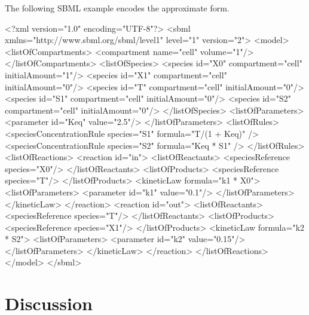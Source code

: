 \documentclass[10pt]{cekarticle}
\newcommand{\changed}[1]{\textcolor{BrickRed}{#1}}
\newenvironment{blockChanged}{\color{BrickRed}}{}
\begin{document}
\begin{blockChanged}
\changed{The following SBML example encodes the approximate form.}

\begin{example}
<?xml version="1.0" encoding="UTF-8"?>
<sbml xmlns="http://www.sbml.org/sbml/level1" level="1" version="\changed{2}">
    <model>
        <listOfCompartments>
            <compartment name="cell" volume="1"/>
        </listOfCompartments>
        <listOfSpecies>
            <species id="X0" compartment="cell" initialAmount="1"/>
            <species id="X1" compartment="cell" initialAmount="0"/>
\changed{            <species id="T"  compartment="cell" initialAmount="0"/>
            <species id="S1" compartment="cell" initialAmount="0"/>
            <species id="S2" compartment="cell" initialAmount="0"/>
        </listOfSpecies>
        <listOfParameters>
            <parameter id="Keq" value="2.5"/>
        </listOfParameters>
        <listOfRules>
            <speciesConcentrationRule species="S1" formula="T/(1 + Keq)" />
            <speciesConcentrationRule species="S2" formula="Keq * S1" />
        </listOfRules>
        <listOfReactions>
            <reaction id="in">
                <listOfReactants>
                    <speciesReference species="X0"/>
                </listOfReactants>
                <listOfProducts>
                    <speciesReference species="T"/>
                </listOfProducts>
                <kineticLaw formula="k1 * X0">
                    <listOfParameters>
                        <parameter id="k1" value="0.1"/>
                    </listOfParameters>
                </kineticLaw>
            </reaction>
            <reaction id="out">
                <listOfReactants>
                    <speciesReference species="T"/>
                </listOfReactants>
                <listOfProducts>
                    <speciesReference species="X1"/>
                </listOfProducts>
                <kineticLaw formula="k2 * S2">
                    <listOfParameters>
                        <parameter id="k2" value="0.15"/>
                    </listOfParameters>
                </kineticLaw>
            </reaction>
        </listOfReactions>
    </model>
</sbml>
}\end{example}
\end{blockChanged}


\section{Discussion}
\label{sec:discussion}
\end{document}
